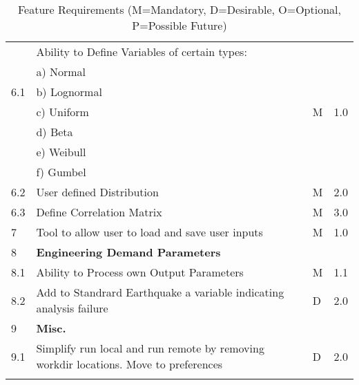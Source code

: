 {\begin{longtable}{| p{} | p{} | p{} | p{} |}
	\multirow{5}{*}{6.1} & Ability to Define Variables of certain types: &  &  \\ 
	 & a)     Normal &  &  \\ 
	 & b)     Lognormal &  &  \\ 
	 & c)     Uniform & M  & 1.0 \\ 
	 & d)     Beta &  &  \\ 
	 & e)     Weibull &  &  \\ 
	 & f)     Gumbel &  &  \\ \hline
	6.2 & User defined Distribution & M & 2.0 \\ \hline
	6.3 & Define Correlation Matrix & M & 3.0 \\ \hline
	7 & Tool to allow user to load and save user inputs & M & 1.0 \\ \hline
	8 & \textbf{Engineering Demand Parameters} &  &  \\ \hline
	8.1 & Ability to Process own Output Parameters & M & 1.1  \\ \hline
	8.2 & Add to Standrard Earthquake a variable indicating analysis failure & D & 2.0  \\ \hline
    9 & \textbf{Misc.} &  &  \\ \hline
	9.1 & Simplify run local and run remote by removing workdir locations. Move to preferences & D & 2.0  \\ \hline
	\bottomrule 
\caption{Feature Requirements (M=Mandatory, D=Desirable, O=Optional, P=Possible Future)}             
  \label{tab:featureRequirements}                 
\end{longtable}
}
